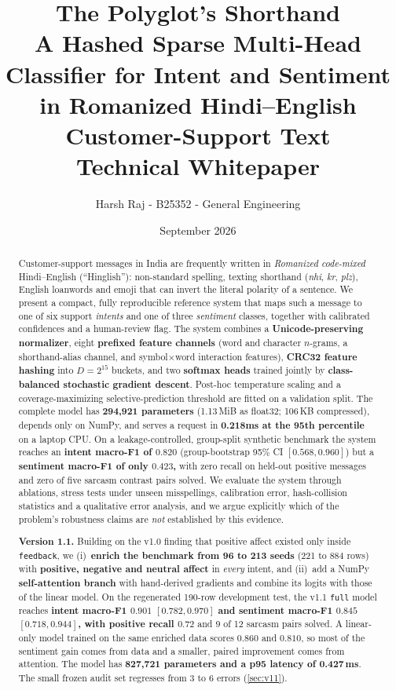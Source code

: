 \documentclass[11pt,a4paper]{article}
\title{\vspace{-1.2em}\textbf{The Polyglot's Shorthand}\\[0.3em]
  \large A Hashed Sparse Multi-Head Classifier for Intent and Sentiment\\
  in Romanized Hindi--English Customer-Support Text\\[0.4em]
  \normalsize\color{muted}Technical Whitepaper\\[0.2em]
  }
\author{Harsh Raj - B25352 - General Engineering}
\date{September 2026}
\theoremstyle{remark}
\newcommand{\lbl}[1]{\texttt{#1}}                      %
\newcommand{\hi}[1]{\textit{#1}}                       %
\begin{document}
\maketitle

\begin{abstract}
\noindent
Customer-support messages in India are frequently written in \emph{Romanized
code-mixed} Hindi--English (``Hinglish''): non-standard spelling, texting
shorthand (\hi{nhi}, \hi{kr}, \hi{plz}), English loanwords and emoji that can
invert the literal polarity of a sentence. We present a compact, fully
reproducible reference system that maps such a message to one of six
support \emph{intents} and one of three \emph{sentiment} classes, together
with calibrated confidences and a human-review flag. The system combines a
\textbf{Unicode-preserving normalizer}, eight \textbf{prefixed feature channels} (word and
character $n$-grams, a shorthand-alias channel, and symbol$\times$word
interaction features), \textbf{CRC32 feature hashing} into $D=2^{15}$ buckets, and two
\textbf{softmax heads }trained jointly by \textbf{class-balanced stochastic gradient descent}.
Post-hoc temperature scaling and a coverage-maximizing selective-prediction
threshold are fitted on a validation split. The complete model has
\textbf{294{,}921 parameters} (1.13\,MiB as float32; 106\,KB compressed), depends only
on NumPy, and serves a request in \textbf{0.218ms at the 95th percentile} on a
laptop CPU. On a leakage-controlled, group-split synthetic benchmark the
system reaches an \textbf{intent macro-F1 of $0.820$} (group-bootstrap 95\% CI
$[0.568, 0.960]$) but a \textbf{sentiment macro-F1 of only $0.423$,} with zero recall
on held-out positive messages and zero of five sarcasm contrast pairs solved.
We evaluate the system through ablations, stress tests under unseen misspellings, calibration
error, hash-collision statistics and a qualitative error analysis, and we
argue explicitly which of the problem's robustness claims are \emph{not}
established by this evidence.

\smallskip\noindent
\textbf{Version 1.1.} Building on the v1.0 finding that positive affect
existed only inside \lbl{feedback}, we (i)~\textbf{enrich the benchmark from 96 to 213
seeds} (221 to 884 rows) with \textbf{positive, negative and neutral affect} in
\emph{every} intent, and (ii)~add a NumPy \textbf{self-attention branch} with
hand-derived gradients and combine its logits with those of the linear model. On the
regenerated 190-row development test, the v1.1 \lbl{full} model reaches \textbf{intent
macro-F1 $0.901$ $[0.782, 0.970]$ and sentiment macro-F1 $0.845$
$[0.718, 0.944]$, with positive recall $0.72$} and 9 of 12 sarcasm pairs solved.
A linear-only model trained on the same enriched data scores $0.860$ and
$0.810$, so most of the sentiment gain comes from data and a smaller, paired
improvement comes from attention. The model has \textbf{827{,}721 parameters and a p95
latency of 0.427\,ms}. The small frozen audit set regresses from 3 to 6 errors
(\cref{sec:v11}).


\end{abstract}
\end{document}
